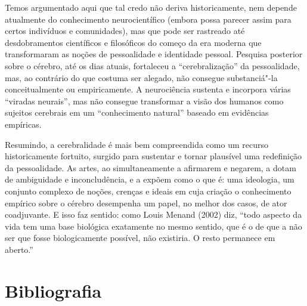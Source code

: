 Temos argumentado aqui que tal credo não deriva historicamente, nem
depende atualmente do conhecimento neurocientífico (embora possa parecer
assim para certos indivíduos e comunidades), mas que pode ser rastreado
até desdobramentos científicos e filosóficos do começo da era moderna
que transformaram as noções de pessoalidade e identidade pessoal.
Pesquisa posterior sobre o cérebro, até os dias atuais, fortaleceu a
``cerebralização'' da pessoalidade, mas, ao contrário do que costuma ser
alegado, não consegue substanciá"-la conceitualmente ou empiricamente. A
neurociência sustenta e incorpora várias ``viradas neurais'', mas não
consegue transformar a visão dos humanos como sujeitos cerebrais em um
``conhecimento natural'' baseado em evidências empíricas.

Resumindo, a cerebralidade é mais bem compreendida como um recurso
historicamente fortuito, surgido para sustentar e tornar plausível uma
redefinição da pessoalidade. As artes, ao simultaneamente a afirmarem e
negarem, a dotam de ambiguidade e inconcludência, e a expõem como o que
é: uma ideologia, um conjunto complexo de noções, crenças e ideais em
cuja criação o conhecimento empírico sobre o cérebro desempenha um papel,
no melhor dos casos, de ator coadjuvante. E isso faz sentido: como Louis
Menand (2002) diz, ``todo aspecto da vida tem uma base biológica
exatamente no mesmo sentido, que é o de que a não ser que fosse
biologicamente possível, não existiria. O resto permanece em aberto.''

\chapter{Bibliografia}


